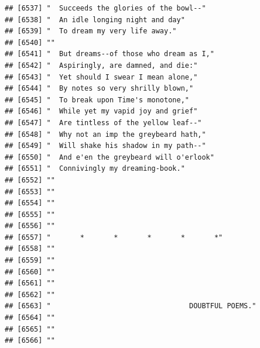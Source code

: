 \documentclass{article}\usepackage[]{graphicx}\usepackage[]{color}
\makeatletter
\newenvironment{kframe}{%
 \def\at@end@of@kframe{}%
 \ifinner\ifhmode%
  \def\at@end@of@kframe{\end{minipage}}%
  \begin{minipage}{\columnwidth}%
 \fi\fi%
 \def\FrameCommand##1{\hskip\@totalleftmargin \hskip-\fboxsep
 \colorbox{shadecolor}{##1}\hskip-\fboxsep
     \hskip-\linewidth \hskip-\@totalleftmargin \hskip\columnwidth}%
 \MakeFramed {\advance\hsize-\width
   \@totalleftmargin\z@ \linewidth\hsize
   \@setminipage}}%
 {\par\unskip\endMakeFramed%
 \at@end@of@kframe}
\newenvironment{knitrout}{}{} %
\makeatother
\begin{document}
\begin{knitrout}
\begin{kframe}
\begin{verbatim}
## [6537] "  Succeeds the glories of the bowl--"                                        
## [6538] "  An idle longing night and day"                                             
## [6539] "  To dream my very life away."                                               
## [6540] ""                                                                            
## [6541] "  But dreams--of those who dream as I,"                                      
## [6542] "  Aspiringly, are damned, and die:"                                          
## [6543] "  Yet should I swear I mean alone,"                                          
## [6544] "  By notes so very shrilly blown,"                                           
## [6545] "  To break upon Time's monotone,"                                            
## [6546] "  While yet my vapid joy and grief"                                          
## [6547] "  Are tintless of the yellow leaf--"                                         
## [6548] "  Why not an imp the greybeard hath,"                                        
## [6549] "  Will shake his shadow in my path--"                                        
## [6550] "  And e'en the greybeard will o'erlook"                                      
## [6551] "  Connivingly my dreaming-book."                                             
## [6552] ""                                                                            
## [6553] ""                                                                            
## [6554] ""                                                                            
## [6555] ""                                                                            
## [6556] ""                                                                            
## [6557] "       *       *       *       *       *"                                    
## [6558] ""                                                                            
## [6559] ""                                                                            
## [6560] ""                                                                            
## [6561] ""                                                                            
## [6562] ""                                                                            
## [6563] "                                 DOUBTFUL POEMS."                            
## [6564] ""                                                                            
## [6565] ""                                                                            
## [6566] ""                                                                            

\end{verbatim}
\end{kframe}
\end{knitrout}
\end{document}
